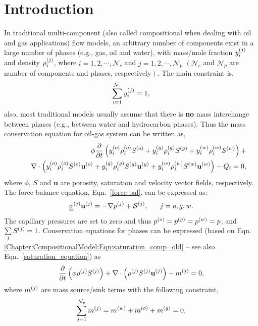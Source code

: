 \section{Introduction}\label{Chapter:CompositionalModel:Section:Introduction}
In traditional multi-component (also called compositional when dealing with oil and gas applications) flow models, an arbitrary number of components exist in a large number of phases (e.g., gas, oil and water), with mass/mole fraction $\mfr[y]{i}{j}$ and density $\mfr[\rho]{i}{j}$, where $i = 1, 2, \cdots, \mathcal{N}_{c}$ and $j=1, 2, \cdots, \mathcal{N}_{p}$ $\left(\mathcal{N}_{c}\right.$ and $\mathcal{N}_{p}$ are number of components and phases, respectively$\left.\right)$. The main constraint is,
   \begin{displaymath}
      \summation_{i=1}^{\mathcal{N}_{c}} \mfr[y]{i}{j} = 1,
   \end{displaymath}
also, most traditional models usually assume that there is {\bf no} mass interchange between phases (e.g., between water and hydrocarbon phases). Thus the mass conservation equation for oil-gas system can be written as,
   \begin{eqnarray}
      &&\phi \frc{\partial}{\partial t}\left( \mfr[y]{i}{o} \mfr[\rho]{i}{o} \mfr[S]{}{o} + \mfr[y]{i}{g} \mfr[\rho]{i}{g} \mfr[S]{}{g} +  \mfr[y]{i}{w} \mfr[\rho]{i}{w} \mfr[S]{}{w}\right) + \nonumber \\
        &&\;\;\;\; \nabla \cdot \left(\mfr[y]{i}{o} \mfr[\rho]{i}{o}\mfr[S]{}{o}  \mfr[\mathbf{u}]{}{o} + \mfr[y]{i}{g}\mfr[\rho]{i}{g}\mfr[S]{}{g} \mfr[\mathbf{u}]{}{g} + \mfr[y]{i}{w} \mfr[\rho]{i}{w}\mfr[S]{}{w} \mfr[\mathbf{u}]{}{w} \right) - Q_i = 0, \label{Chapter:CompositionalModel:Eqn:saturation_comp_old}
   \end{eqnarray}
where $\phi$, $S$ and $\mathbf{u}$ are porosity, saturation and velocity vector fields, respectively. The force balance equation, Eqn.~\ref{force-bal}, can be expressed as:
   \begin{equation}
       \mfr[\underline{\underline{\sigma}}]{}{j} \mfr[\mathbf u]{}{j} = - \nabla \mfr[p]{}{j} + \mfr[\mathcal{S}]{}{j}, ~~~~~ j = o,g,w .\label{Chapter:CompositionalModel:Eqn:ForceBalance}
   \end{equation}
The capillary pressures are set to zero and thus $\mfr[p]{}{o} = \mfr[p]{}{g} = \mfr[p]{}{w}  = p $, and $\summation_{j}\mfr[S]{}{j} = 1$. Conservation equations for phases can be expressed (based on Eqn. \ref{Chapter:CompositionalModel:Eqn:saturation_comp_old} -- see also Eqn.~\ref{saturation_equation}) as 
   \begin{equation}
       \displaystyle\frac{\partial}{\partial t}\left(\phi\mfr[\rho]{}{j}\mfr[S]{}{j}\right) + \nabla\cdot\left(\mfr[\rho]{}{j}\mfr[S]{}{j}\mfr[\mathbf{u}]{}{j}\right) -\mfr[m]{}{j} = 0, \label{saturation_compositional_1}
   \end{equation}
where $\mfr[m]{}{j}$ are mass source/sink terms with the following constraint,
   \begin{displaymath}
      \summation_{j=1}^{{\cal N}_p} \mfr[m]{}{j}=\mfr[m]{}{w}+\mfr[m]{}{o}+\mfr[m]{}{g}=0. 
   \end{displaymath}

